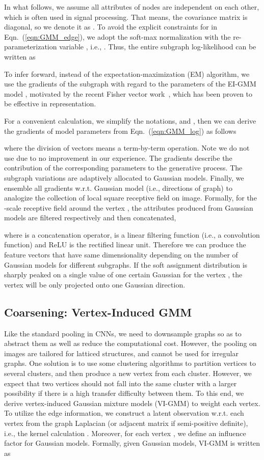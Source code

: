 \documentclass[letterpaper]{article} \usepackage{aaai19}  \usepackage{times}  \usepackage{helvet}  \usepackage{courier}  \usepackage{url}  \usepackage{graphicx}  \frenchspacing  \setlength{\pdfpagewidth}{8.5in}  \setlength{\pdfpageheight}{11in}
\def\ie{{i.e.}} \def\etal{{et.al}}
\begin{document}
In what follows, we assume all attributes of nodes are independent on each other, which is often used in signal processing. That means, the covariance matrix  is diagonal, so we denote it as . To avoid the explicit constraints for  in Eqn.~(\ref{eqn:GMM_edge}), we adopt the soft-max normalization with the re-parameterization variable , \ie, . Thus, the entire subgraph log-likelihood can be written as

To infer forward, instead of the expectation-maximization (EM) algorithm, we use the gradients of the subgraph with regard to the parameters of the EI-GMM model , motivated by the recent Fisher vector work~\cite{sanchez2013image}, which has been proven to be effective in representation.

For a convenient calculation, we simplify the notations,  and , then we can derive the gradients of model parameters from Eqn.~(\ref{eqn:GMM_log}) as follows
 
where the division of vectors means a term-by-term operation. Note we do not use  due to no improvement in our experience. The gradients describe the contribution of the corresponding parameters to the generative process. The subgraph variations are adaptively allocated to  Gaussian models. Finally, we ensemble all gradients w.r.t. Gaussian model (\ie, directions of graph) to analogize the collection of local square receptive field on image. Formally, for the -scale receptive field  around the vertex , the attributes produced from Gaussian models are filtered respectively and then concatenated,

where  is a concatenation operator,  is a linear filtering function (\ie, a convolution function) and ReLU is the rectified linear unit. Therefore we can produce the feature vectors that have same dimensionality depending on the number of Gaussian models for different subgraphs. If the soft assignment distribution  is sharply peaked on a single value of one certain Gaussian for the vertex , the vertex will be only projected onto one Gaussian direction.

\subsection{Coarsening: Vertex-Induced GMM}

Like the standard pooling in CNNs, we need to downsample graphs so as to abstract them as well as reduce the computational cost. However, the pooling on images are tailored for latticed structures, and cannot be used for irregular graphs. One solution is to use some clustering algorithms to partition vertices to several clusters, and then produce a new vertex from each cluster. However, we expect that two vertices should not fall into the same cluster with a larger possibility if there is a high transfer difficulty between them. To this end, we derive vertex-induced Gaussian mixture models (VI-GMM) to weight each vertex. To utilize the edge information,  we construct a latent observation  w.r.t. each vertex  from the graph Laplacian (or adjacent matrix if semi-positive definite), \ie, the kernel calculation . Moreover, for each vertex , we define an influence factor  for Gaussian models. Formally, given  Gaussian models, VI-GMM is written as
\end{document}
